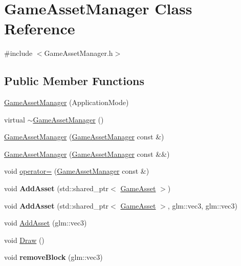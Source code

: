 \hypertarget{classGameAssetManager}{}\section{Game\+Asset\+Manager Class Reference}
\label{classGameAssetManager}


{\ttfamily \#include $<$Game\+Asset\+Manager.\+h$>$}

\subsection*{Public Member Functions}
\begin{DoxyCompactItemize}
\item 
\hyperlink{classGameAssetManager_aaa0d58e276cc10ad91a7457085598a71}{Game\+Asset\+Manager} (Application\+Mode)
\item 
virtual \hyperlink{classGameAssetManager_a1270bd61ecbcca563f079803e40c9b77}{$\sim$\+Game\+Asset\+Manager} ()
\item 
\hyperlink{classGameAssetManager_a2c9adcb72faa154c87eadc9bafe5269d}{Game\+Asset\+Manager} (\hyperlink{classGameAssetManager}{Game\+Asset\+Manager} const \&)
\item 
\hyperlink{classGameAssetManager_a44f6e2fd6b8ff1dd64e5697f1be7386d}{Game\+Asset\+Manager} (\hyperlink{classGameAssetManager}{Game\+Asset\+Manager} const \&\&)
\item 
void \hyperlink{classGameAssetManager_ac72678a4ad5378c685aa6bae84a4e712}{operator=} (\hyperlink{classGameAssetManager}{Game\+Asset\+Manager} const \&)
\item 
void {\bfseries Add\+Asset} (std\+::shared\+\_\+ptr$<$ \hyperlink{classGameAsset}{Game\+Asset} $>$)\hypertarget{classGameAssetManager_ad3de8ff00d55ba04728b1de8213b2349}{}\label{classGameAssetManager_ad3de8ff00d55ba04728b1de8213b2349}

\item 
void {\bfseries Add\+Asset} (std\+::shared\+\_\+ptr$<$ \hyperlink{classGameAsset}{Game\+Asset} $>$, glm\+::vec3, glm\+::vec3)\hypertarget{classGameAssetManager_abaa0b83769cf2ba407ac01a931421b20}{}\label{classGameAssetManager_abaa0b83769cf2ba407ac01a931421b20}

\item 
void \hyperlink{classGameAssetManager_ab8f8ad391e085a73f966d15c17c0ac4c}{Add\+Asset} (glm\+::vec3)
\item 
void \hyperlink{classGameAssetManager_a32837132bd70a9a9ed537323c2d3d886}{Draw} ()
\item 
void {\bfseries remove\+Block} (glm\+::vec3)\hypertarget{classGameAssetManager_a957c5982fc466820225e5aa490fa8249}{}\label{classGameAssetManager_a957c5982fc466820225e5aa490fa8249}


\end{DoxyCompactItemize}
